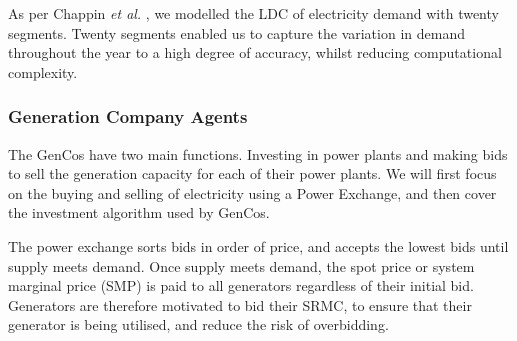 
As per Chappin \textit{et al.} \cite{Chappin2017}, we modelled the LDC of electricity demand with twenty segments. Twenty segments enabled us to capture the variation in demand throughout the year to a high degree of accuracy, whilst reducing computational complexity. 


\subsubsection{Generation Company Agents} The GenCos have two main functions. Investing in power plants and making bids to sell the generation capacity for each of their power plants. We will first focus on the buying and selling of electricity using a Power Exchange, and then cover the investment algorithm used by GenCos.


The power exchange sorts bids in order of price, and accepts the lowest bids until supply meets demand. Once supply meets demand, the spot price or system marginal price (SMP) is paid to all generators regardless of their initial bid. Generators are therefore motivated to bid their SRMC, to ensure that their generator is being utilised, and reduce the risk of overbidding.




